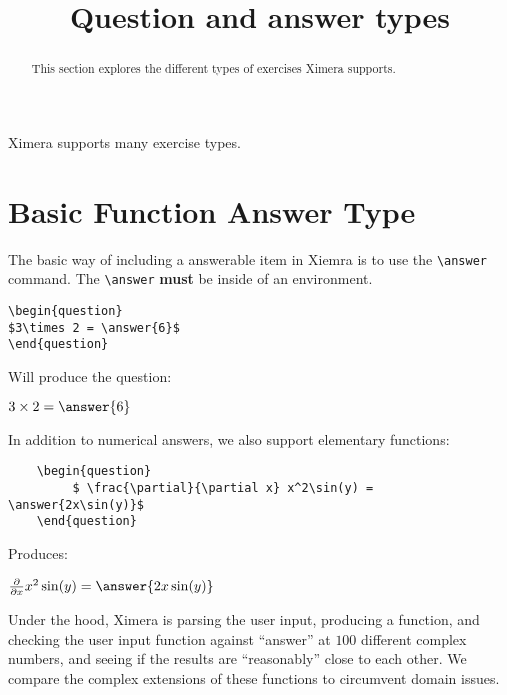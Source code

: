 \documentclass{ximera}
\title{Question and answer types}
\begin{document}
\begin{abstract}
  This section explores the different types of exercises Ximera supports. 
\end{abstract}
\maketitle

Ximera supports many exercise types.


\section{Basic Function Answer Type}

The basic way of including a answerable item in Xiemra is to use the
\verb|\answer| command. The \verb|\answer| \textbf{must} be inside of
an environment.

\begin{verbatim}
\begin{question}
$3\times 2 = \answer{6}$
\end{question}
\end{verbatim}

Will produce the question:

\begin{question}
  $3\times 2 = \answer{6}$
\end{question}

In addition to numerical answers, we also support elementary functions:

\begin{verbatim}
    \begin{question}
         $ \frac{\partial}{\partial x} x^2\sin(y) =  \answer{2x\sin(y)}$
    \end{question}
\end{verbatim}

Produces:

\begin{question}
  $ \frac{\partial}{\partial x} x^2\sin(y) = \answer{2x\sin(y)}$
\end{question}

\begin{remark}
Under the hood, Ximera is parsing the user input, producing a
function, and checking the user input function against ``answer'' at
$100$ different complex numbers, and seeing if the results are
``reasonably'' close to each other.  We compare the complex extensions
of these functions to circumvent domain issues.
\end{remark}
\end{document}
